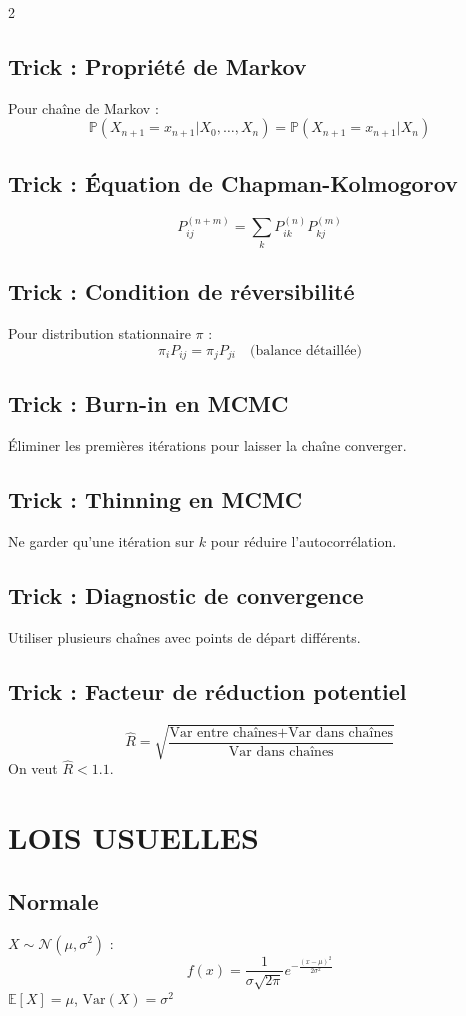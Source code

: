 \documentclass[10pt,a4paper]{article}
\begin{document}
\begin{multicols}{2}
\subsection*{Trick : Propriété de Markov}
Pour chaîne de Markov :
\[
\mathbb{P}(X_{n+1} = x_{n+1} | X_0, \ldots, X_n) = \mathbb{P}(X_{n+1} = x_{n+1} | X_n)
\]

\subsection*{Trick : Équation de Chapman-Kolmogorov}
\[
P^{(n+m)}_{ij} = \sum_k P^{(n)}_{ik} P^{(m)}_{kj}
\]

\subsection*{Trick : Condition de réversibilité}
Pour distribution stationnaire $\pi$ :
\[
\pi_i P_{ij} = \pi_j P_{ji} \quad \text{(balance détaillée)}
\]

\subsection*{Trick : Burn-in en MCMC}
Éliminer les premières itérations pour laisser la chaîne converger.

\subsection*{Trick : Thinning en MCMC}
Ne garder qu'une itération sur $k$ pour réduire l'autocorrélation.

\subsection*{Trick : Diagnostic de convergence}
Utiliser plusieurs chaînes avec points de départ différents.

\subsection*{Trick : Facteur de réduction potentiel}
\[
\hat{R} = \sqrt{\frac{\text{Var entre chaînes} + \text{Var dans chaînes}}{\text{Var dans chaînes}}}
\]
On veut $\hat{R} < 1.1$.

\section*{LOIS USUELLES}

\subsection*{Normale}
$X \sim \mathcal{N}(\mu, \sigma^2)$ :
\[
f(x) = \frac{1}{\sigma\sqrt{2\pi}} e^{-\frac{(x-\mu)^2}{2\sigma^2}}
\]
$\mathbb{E}[X] = \mu$, $\text{Var}(X) = \sigma^2$


\end{multicols}
\end{document}
